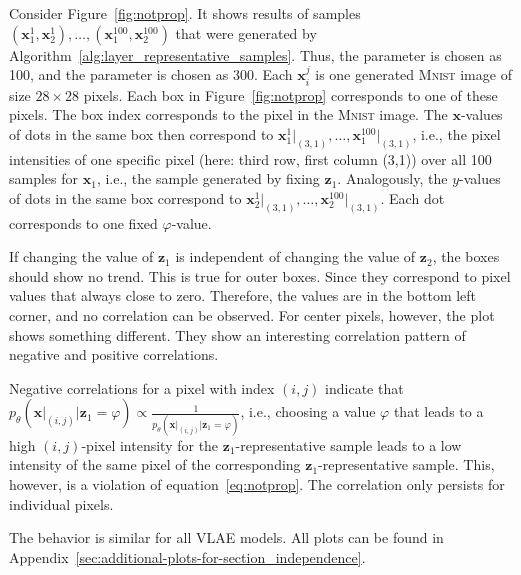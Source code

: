 Consider Figure~\ref{fig:notprop}.
It shows results of samples $(\bm{x}_1^1,\bm{x}_2^1),\dots,(\bm{x}_1^{100},\bm{x}_2^{100})$ that were generated by Algorithm~\ref{alg:layer_representative_samples}.
Thus, the parameter  is chosen as 100, and the parameter  is chosen as 300.
Each $\bm{x}_i^j$ is one generated \textsc{Mnist} image of size $28\times 28$ pixels.
Each box in Figure~\ref{fig:notprop} corresponds to one of these pixels.
The box index corresponds to the pixel in the \textsc{Mnist} image.
The $\bm{x}$-values of dots in the same box then correspond to $\bm{x}_1^1\big|_{(3,1)}, \dots, \bm{x}_1^{100}\big|_{(3,1)}$, i.e., the pixel intensities of one specific pixel (here: third row, first column (3,1)) over all 100 samples for $\bm{x}_1$, i.e., the sample generated by fixing $\bm{z}_1$.
Analogously, the $y$-values of dots in the same box correspond to $\bm{x}_2^1\big|_{(3,1)}, \dots, \bm{x}_2^{100}\big|_{(3,1)}$.
Each dot corresponds to one fixed $\varphi$-value.

If changing the value of $\bm{z}_1$ is independent of changing the value of $\bm{z}_2$, the boxes should show no trend.
This is true for outer boxes.
Since they correspond to pixel values that always close to zero.
Therefore, the values are in the bottom left corner, and no correlation can be observed.
For center pixels, however, the plot shows something different.
They show an interesting correlation pattern of negative and positive correlations.

Negative correlations for a pixel with index $(i,j)$ indicate that $p_\theta(\bm{x}\big|_{(i,j)} | \bm{z}_1 = \varphi) \propto \frac{1}{p_\theta(\bm{x}\big|_{(i,j)} | \bm{z}_1 = \varphi)}$, i.e., choosing a value $\varphi$ that leads to a high $(i,j)$-pixel intensity for the $\bm{z}_1$-representative sample leads to a low intensity of the same pixel of the corresponding $\bm{z}_1$-representative sample.
This, however, is a violation of equation~\ref{eq:notprop}.
The correlation only persists for individual pixels.

The behavior is similar for all \ac{VLAE} models.
All plots can be found in Appendix~\ref{sec:additional-plots-for-section_independence}.

